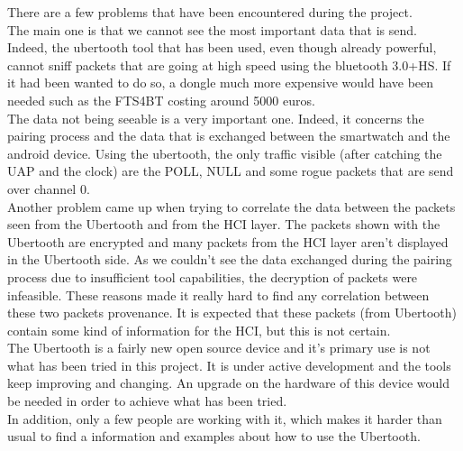 \label{subsec:problems}
There are a few problems that have been encountered during the project. \\
The main one is that we cannot see the most important data that is send. Indeed, the ubertooth tool that has been used, even though already powerful, cannot sniff packets that are going at high speed using the bluetooth 3.0+HS. If it had been wanted to do so, a dongle much more expensive would have been needed such as the FTS4BT costing around 5000 euros.\\
The data not being seeable is a very important one. Indeed, it concerns the pairing process and the data that is exchanged between the smartwatch and the android device. Using the ubertooth, the only traffic visible (after catching the UAP and the clock) are the POLL, NULL and some rogue packets that are send over channel 0.\\

Another problem came up when trying to correlate the data between the packets seen from the Ubertooth and from the HCI layer. The packets shown with the Ubertooth are encrypted and many packets from the HCI layer aren't displayed in the Ubertooth side. As we couldn't see the data exchanged during the pairing process due to insufficient tool capabilities, the decryption of packets were infeasible. These reasons made it really hard to find any correlation between these two packets provenance. It is expected that these packets (from Ubertooth) contain some kind of information for the HCI, but this is not certain.\\

The Ubertooth is a fairly new open source device and it's primary use is not what has been tried in this project. It is under active development and the tools keep improving and changing. An upgrade on the hardware of this device would be needed in order to achieve what has been tried. \\
In addition, only a few people are working with it, which makes it harder than usual to find a information and examples about how to use the Ubertooth.